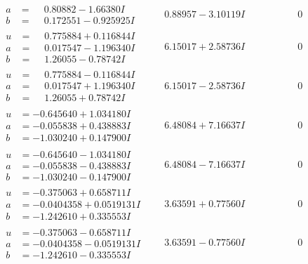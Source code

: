 \documentclass[1p]{elsarticle_modified}
\theoremstyle{definition}
\begin{document}
$$\begin{array}{c|c|c}
\begin{aligned}
a &= \phantom{-}0.80882 - 1.66380 I \\
b &= \phantom{-}0.172551 - 0.925925 I\end{aligned}
 & \phantom{-}0.88957 - 3.10119 I & \phantom{-0.000000 } 0 \\ \hline\begin{aligned}
u &= \phantom{-}0.775884 + 0.116844 I \\
a &= \phantom{-}0.017547 - 1.196340 I \\
b &= \phantom{-}1.26055 - 0.78742 I\end{aligned}
 & \phantom{-}6.15017 + 2.58736 I & \phantom{-0.000000 } 0 \\ \hline\begin{aligned}
u &= \phantom{-}0.775884 - 0.116844 I \\
a &= \phantom{-}0.017547 + 1.196340 I \\
b &= \phantom{-}1.26055 + 0.78742 I\end{aligned}
 & \phantom{-}6.15017 - 2.58736 I & \phantom{-0.000000 } 0 \\ \hline\begin{aligned}
u &= -0.645640 + 1.034180 I \\
a &= -0.055838 + 0.438883 I \\
b &= -1.030240 + 0.147900 I\end{aligned}
 & \phantom{-}6.48084 + 7.16637 I & \phantom{-0.000000 } 0 \\ \hline\begin{aligned}
u &= -0.645640 - 1.034180 I \\
a &= -0.055838 - 0.438883 I \\
b &= -1.030240 - 0.147900 I\end{aligned}
 & \phantom{-}6.48084 - 7.16637 I & \phantom{-0.000000 } 0 \\ \hline\begin{aligned}
u &= -0.375063 + 0.658711 I \\
a &= -0.0404358 + 0.0519131 I \\
b &= -1.242610 + 0.335553 I\end{aligned}
 & \phantom{-}3.63591 + 0.77560 I & \phantom{-0.000000 } 0 \\ \hline\begin{aligned}
u &= -0.375063 - 0.658711 I \\
a &= -0.0404358 - 0.0519131 I \\
b &= -1.242610 - 0.335553 I\end{aligned}
 & \phantom{-}3.63591 - 0.77560 I & \phantom{-0.000000 } 0\\

\end{array}$$
\end{document}
